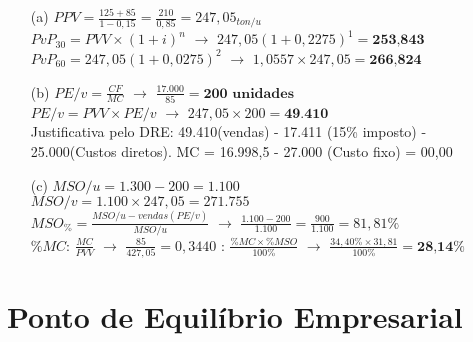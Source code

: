 \documentclass[report]{uftex}
\begin{document}
\begin{itemize}
	\item[(a)] $PPV = \frac{125 + 85}{1-0,15} = \frac{210}{0,85} = 247,05_{ton/u}$ \\
$PvP_{30} = PVV \times (1+i)^n$ $\rightarrow$ $247,05(1 + 0,2275)^1 = \textbf{253,843}$ \\
$PvP_{60} = 247,05(1+0,0275)^2$ $\rightarrow$ $1,0557 \times 247,05 = \textbf{266,824}$
	
	\item[(b)] $PE/v = \frac{CF}{MC}$ $\rightarrow$ $\frac{17.000}{85} = \textbf{200 unidades}$ \\
$PE/v = PVV \times PE/v$ $\rightarrow$ $247,05 \times 200 = \textbf{49.410}$ \\
Justificativa pelo DRE: 49.410(vendas) - 17.411 (15\% imposto) - 25.000(Custos diretos). MC = 16.998,5 - 27.000 (Custo fixo) = 00,00
	
	\item[(c)] $MSO/u = 1.300 - 200 = 1.100$ \\
$MSO/v = 1.100 \times 247,05 = 271.755$ \\
$MSO_\% = \frac{MSO/u - vendas(PE/v)}{MSO/u}$ $\rightarrow$ $\frac{1.100-200}{1.100} = \frac{900}{1.100} = 81,81\%$ \\
$\%MC$: $\frac{MC}{PVV}$ $\rightarrow$ $\frac{85}{427,05} = 0,3440$
: $\frac{\%MC \times \%MSO}{100\%}$ $\rightarrow$ $\frac{34,40\% \times 31,81}{100\%} = \textbf{28,14\%}$

\end{itemize}

\chapter{Ponto de Equilíbrio Empresarial}
\end{document}
